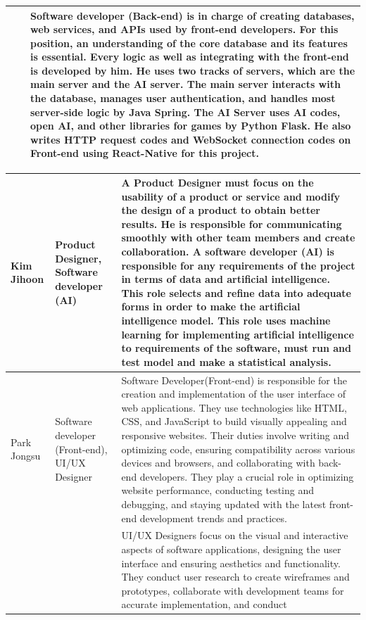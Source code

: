 \documentclass[conference]{IEEEtran}
\begin{document}
\begin{table}[htbp]
     \begin{tabular}{|p{1cm}|p{1.7cm}|p{5cm}|}
     \hline
     & &
     Software developer (Back-end) is in charge of creating databases, web services, and APIs used by front-end developers. For this position, an understanding of the core database and its features is essential. Every logic as well as integrating with the front-end is developed by him. He uses two tracks of servers, which are the main server and the AI server. The main server interacts with the database, manages user authentication, and handles most server-side logic by Java Spring. The AI Server uses AI codes, open AI, and other libraries for games by Python Flask. He also writes HTTP request codes and WebSocket connection codes on Front-end using React-Native for this project.\\
     \hline
\end{tabular}

 \begin{tabular}{|p{1cm}|p{1.7cm}|p{5cm}|}
     Kim Jihoon & Product Designer, Software developer (AI) & 
     A Product Designer must focus on the usability of a product or service and modify the design of a product to obtain better results. He is responsible for communicating smoothly with other team members and create collaboration.
     A software developer (AI) is responsible for any requirements of the project in terms of data and artificial intelligence. This role selects and refine data into adequate forms in order to make the artificial intelligence model. This role uses machine learning for implementing artificial intelligence to requirements of the software, must run and test model and make a statistical analysis.
     \\
     \hline
     Park Jongsu & Software developer (Front-end), UI/UX Designer & 
     Software Developer(Front-end) is responsible for the creation and implementation of the user interface of web applications. They use technologies like HTML, CSS, and JavaScript to build visually appealing and responsive websites. Their duties involve writing and optimizing code, ensuring compatibility across various devices and browsers, and collaborating with back-end developers. They play a crucial role in optimizing website performance, conducting testing and debugging, and staying updated with the latest front-end development trends and practices.\\
     & & 
     UI/UX Designers focus on the visual and interactive aspects of software applications, designing the user interface and ensuring aesthetics and functionality. They conduct user research to create wireframes and prototypes, collaborate with development teams for accurate implementation, and conduct\\
     \hline
     \end{tabular}
 \end{table}
 
\end{document}
